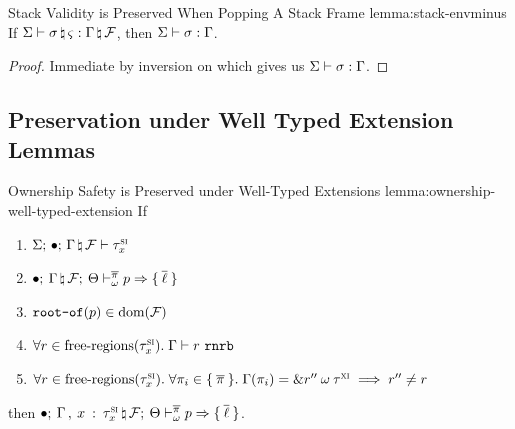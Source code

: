 \begin{oxlemma}{Stack Validity is Preserved When Popping A Stack Frame}
  {lemma:stack-envminus} If
  $\Sigma \vdash \sigma \, \natural \, \varsigma : \Gamma \, \natural \, \mathcal{F}$,
  then $\Sigma \vdash \sigma : \Gamma$.
\end{oxlemma}

\begin{proof}
  Immediate by inversion on  which gives us
  $\Sigma \vdash \sigma : \Gamma$.
\end{proof}

\subsection{Preservation under Well Typed Extension Lemmas}
\label{sec:extension-lemmas}

\begin{oxlemma}{Ownership Safety is Preserved under Well-Typed Extensions}
  {lemma:ownership-well-typed-extension} If
  \begin{enumerate}
  \item
    $\Sigma; \, \bullet; \, \Gamma \, \natural \, \mathcal{F} \vdash \tau^\textsc{si}_x$
  \item
    $\bullet; \: \Gamma \, \natural \, \mathcal{F}; \: \Theta \vdash^{\overline{\pi}}_{\omega} p \Rightarrow \{ \: \overline{\ell} \: \}$
  \item $\texttt{root-of}(p) \in \textrm{dom}(\mathcal{F})$
  \item $\forall r \in \textrm{free-regions}(\tau^\textsc{si}_x). \;
    \Gamma \vdash r \ \mathtt{rnrb}$
  \item $\forall r \in \textrm{free-regions}(\tau^\textsc{si}_x). \; \forall \pi_i
    \in \{ \: \overline{\pi} \: \}. \; \Gamma(\pi_i) =
    \& r^{\prime\prime} \: \omega \: \tau^\textsc{xi} \implies
    r^{\prime\prime} \neq r$
  \end{enumerate}
  then
  $\bullet; \: \Gamma \, , \: x \: : \: \tau^\textsc{si}_x \, \natural \, \mathcal{F}; \: \Theta \vdash^{\overline{\pi}}_{\omega} p \Rightarrow \{ \: \overline{\ell} \: \}$.
\end{oxlemma}

